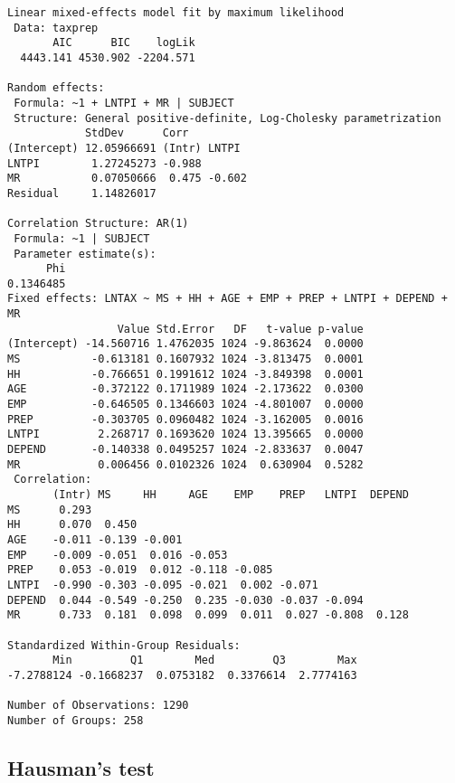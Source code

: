 \documentclass[]{book}
\begin{document}
\begin{verbatim}
Linear mixed-effects model fit by maximum likelihood
 Data: taxprep 
       AIC      BIC    logLik
  4443.141 4530.902 -2204.571

Random effects:
 Formula: ~1 + LNTPI + MR | SUBJECT
 Structure: General positive-definite, Log-Cholesky parametrization
            StdDev      Corr         
(Intercept) 12.05966691 (Intr) LNTPI 
LNTPI        1.27245273 -0.988       
MR           0.07050666  0.475 -0.602
Residual     1.14826017              

Correlation Structure: AR(1)
 Formula: ~1 | SUBJECT 
 Parameter estimate(s):
      Phi 
0.1346485 
Fixed effects: LNTAX ~ MS + HH + AGE + EMP + PREP + LNTPI + DEPEND + MR 
                 Value Std.Error   DF   t-value p-value
(Intercept) -14.560716 1.4762035 1024 -9.863624  0.0000
MS           -0.613181 0.1607932 1024 -3.813475  0.0001
HH           -0.766651 0.1991612 1024 -3.849398  0.0001
AGE          -0.372122 0.1711989 1024 -2.173622  0.0300
EMP          -0.646505 0.1346603 1024 -4.801007  0.0000
PREP         -0.303705 0.0960482 1024 -3.162005  0.0016
LNTPI         2.268717 0.1693620 1024 13.395665  0.0000
DEPEND       -0.140338 0.0495257 1024 -2.833637  0.0047
MR            0.006456 0.0102326 1024  0.630904  0.5282
 Correlation: 
       (Intr) MS     HH     AGE    EMP    PREP   LNTPI  DEPEND
MS      0.293                                                 
HH      0.070  0.450                                          
AGE    -0.011 -0.139 -0.001                                   
EMP    -0.009 -0.051  0.016 -0.053                            
PREP    0.053 -0.019  0.012 -0.118 -0.085                     
LNTPI  -0.990 -0.303 -0.095 -0.021  0.002 -0.071              
DEPEND  0.044 -0.549 -0.250  0.235 -0.030 -0.037 -0.094       
MR      0.733  0.181  0.098  0.099  0.011  0.027 -0.808  0.128

Standardized Within-Group Residuals:
       Min         Q1        Med         Q3        Max 
-7.2788124 -0.1668237  0.0753182  0.3376614  2.7774163 

Number of Observations: 1290
Number of Groups: 258 
\end{verbatim}

\hypertarget{hausmans-test-1}{%
\subsection{Hausman's test}\label{hausmans-test-1}}
\end{document}
